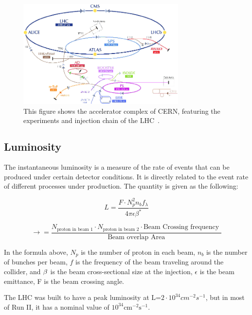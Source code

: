 \begin{figure}[!htb]
    \begin{center}
        \includegraphics[width=0.75\textwidth]{figures/chapter_ATLAS/LHCAcceleratorComplex}
        \caption{
			This figure shows the accelerator complex of CERN, featuring the experiments and injection chain of the LHC~\cite{Marcastel:1621583}.
        }
        \label{fig:CERNAcceleratorComplex}
    \end{center}
\end{figure}

\subsection{Luminosity}
The instantaneous luminosity is a measure of the rate of events that can be produced under certain detector conditions. It is directly related to the event rate of different processes under production.   
The quantity is given as the following:

\begin{equation}
    L = \frac{F \cdot N^{2}_{p} n_{b} f_{\lambda}}{4\pi\epsilon \beta^{*}}
\end{equation}


\begin{equation}
    \rightarrow = \frac{N_{\textrm{proton in beam 1}} \cdot N_{\textrm{proton in beam 2}} \cdot \textrm{Beam Crossing frequency }}{\textrm{Beam overlap Area}}
\end{equation}

In the formula above, $N_p$ is the number of proton in each beam, $n_{b}$ is the number of bunches per beam, $f$ is the frequency of the beam traveling around the collider, and $\beta^{\*}$ is the beam cross-sectional size at the injection, $\epsilon$ is the beam emittance, F is the beam crossing angle.

The LHC was built to have a peak luminosity at L=$2 \cdot 10^{34}cm^{-2}s^{-1}$, but in most of Run II, it has a nominal value of $10^{34}\textrm{cm}^{-2}\textrm{s}^{-1}$.

